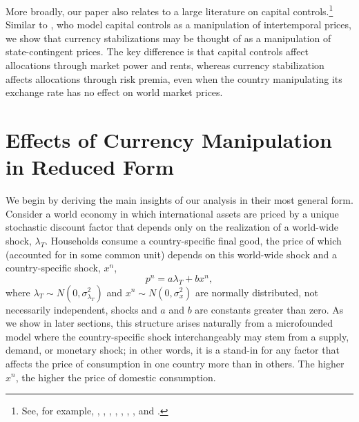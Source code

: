 \documentclass[12pt,letter]{article}
\theoremstyle{break} \theorembodyfont{\normalfont\itshape}
\theoremstyle{break}
\theoremstyle{break} \theorembodyfont{\normalfont\itshape}
\theoremstyle{break} \theorembodyfont{\normalfont\itshape}
\begin{document}
More broadly, our paper also relates to a large literature on capital
controls.\footnote{See, for example, \citet*{CalvoMendoza2000},
  \citet*{JeanneKorinek2010}, \citet*{Bianchi2011},
  \citet*{FarhiWerning2012, FarhiWerning2013},
  \citet*{Schmitt-GroheUribe2012}, \citet*{Korinek2013},
  \cite{KorinekSimsek2016}, and \citet*{Bocola2019}.} Similar to
\citet*{CostinotLorenzoniWerning2014}, who model capital controls as a
manipulation of intertemporal prices, we show that currency
stabilizations may be thought of as a manipulation of state-contingent
prices. The key difference is that capital controls affect allocations
through market power and rents, whereas currency stabilization affects
allocations through risk premia, even when the country manipulating
its exchange rate has no effect on world market prices.


\section{Effects of Currency Manipulation in Reduced
  Form \label{sec_ReducedFormResults}}

We begin by deriving the main insights of our analysis in their most
general form. Consider a world economy in which international assets
are priced by a unique stochastic discount factor that depends only on
the realization of a world-wide shock, $\lambda_T$. Households consume
a country-specific final good, the price of which (accounted for in
some common unit) depends on this world-wide shock and a
country-specific shock, $x^n$,
\begin{equation}
  p^{n}=a\lambda _{T}+b x^{n},  \label{eq_RF}
\end{equation}%
where $\lambda _{T}\sim N(0,\sigma^2_{\lambda_{T}})$ and
$x^{n} \sim N(0,\sigma^2_x) $ are normally distributed, not
necessarily independent, shocks and $a$ and $b$ are constants greater
than zero. As we show in later sections, this structure arises
naturally from a microfounded model where the country-specific shock
interchangeably may stem from a supply, demand, or monetary shock; in
other words, it is a stand-in for any factor that affects the price of
consumption in one country more than in others. The higher $x^{n}$,
the higher the price of domestic consumption.


\end{document}
